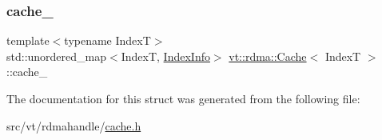 \subsubsection{\texorpdfstring{cache\+\_\+}{cache\_}}
{\footnotesize\ttfamily template$<$typename IndexT$>$ \\
std\+::unordered\+\_\+map$<$IndexT, \hyperlink{structvt_1_1rdma_1_1_index_info}{Index\+Info}$>$ \hyperlink{structvt_1_1rdma_1_1_cache}{vt\+::rdma\+::\+Cache}$<$ IndexT $>$\+::cache\+\_\+\hspace{0.3cm}{\ttfamily [private]}}



The documentation for this struct was generated from the following file\+:\begin{DoxyCompactItemize}
\item 
src/vt/rdmahandle/\hyperlink{rdmahandle_2cache_8h}{cache.\+h}\end{DoxyCompactItemize}

